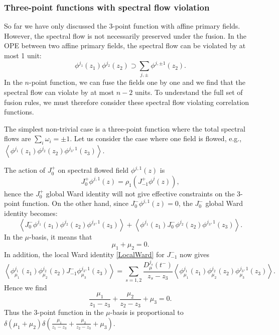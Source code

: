 \documentclass[10pt,a4paper]{article}
\numberwithin{equation}{section}
\newcommand{\vev}[1]{\left\langle #1 \right\rangle}
\begin{document}
\subsubsection*{Three-point functions with spectral flow violation}
So far we have only discussed the 3-point function with affine primary fields. However, the spectral flow is not necessarily preserved 
under the fusion. In the OPE between two affine primary fields, the spectral flow can be violated by at most 1 unit: 
\begin{equation}
    \phi^{j_{1}}(z_{1}) \phi^{j_{2}}(z_{2}) \supset \sum_{j,\pm} \phi^{j,\pm 1}(z_{2}).
\end{equation}
In the $n$-point function, we can fuse the fields one by one and we find that the spectral flow can violate by at most $n-2$ units. 
To understand the full set of fusion rules, we must therefore consider these spectral flow violating correlation functions.

The simplest non-trivial case is a three-point function where the total spectral flows are $\sum_{i} \omega_{i} = \pm 1$. 
Let us consider the case where one field is flowed, e.g., $\vev{\phi^{j_{1}}(z_{1}) \phi^{j_{2}}(z_{2}) \phi^{j_{3},1}(z_{3})}$. 

The action of $J^{+}_{0}$ on spectral flowed field $\phi^{j,1}(z)$ is 
\begin{equation}
    J^{+}_{0}\phi^{j,1}(z) = \rho_{1} \left(J^{+}_{-1} \phi^{j}(z)\right),
\end{equation}
hence the $J^{+}_{0}$ global Ward identity will 
not give effective constraints on the 3-point function. On the other hand, since $J^{-}_{0} \phi^{j,1}(z) = 0$, 
the $J^{-}_{0}$ global Ward identity becomes: 
\begin{equation}
    \vev{J^{-}_{0} \phi^{j_{1}}(z_{1}) \phi^{j_{2}}(z_{2}) \phi^{j_{3},1}(z_{3})} + \vev{\phi^{j_{1}}(z_{1}) J^{-}_{0} \phi^{j_{2}}(z_{2}) \phi^{j_{3},1}(z_{3})}.
\end{equation}
In the $\mu$-basis, it means that 
\begin{equation}
    \mu_{1} + \mu_{2} = 0.
\end{equation}
In addition, the local Ward identity \eqref{LocalWard} for $J^{-}_{-1}$ now gives 
\begin{equation}
    \vev{ \phi^{j_{1}}_{\mu_{1}}(z_{1}) \phi^{j_{2}}_{\mu_{2}}(z_{2}) J^{-}_{-1} \phi^{j_{3},1}_{\mu_{3}}(z_{3})} 
    = \sum_{s=1,2} \frac{D^{j_{s}}_{\mu}(t^{-})}{z_{s}-z_{3}} \vev{ \phi^{j_{1}}_{\mu_{1}}(z_{1}) \phi^{j_{2}}_{\mu_{2}}(z_{2}) \phi^{j_{3},1}_{\mu_{3}}(z_{3})}.
\end{equation}
Hence we find 
\begin{equation}
    \frac{\mu_{1}}{z_{1}-z_{3}} + \frac{\mu_{2}}{z_{2}-z_{3}} + \mu_{3} = 0.
\end{equation}
Thus the 3-point function in the $\mu$-basis is proportional to 
$\delta(\mu_{1} + \mu_{2}) \delta\left(\frac{\mu_{1}}{z_{1}-z_{3}} + \frac{\mu_{2}}{z_{2}-z_{3}} + \mu_{3}\right)$.
\end{document}
